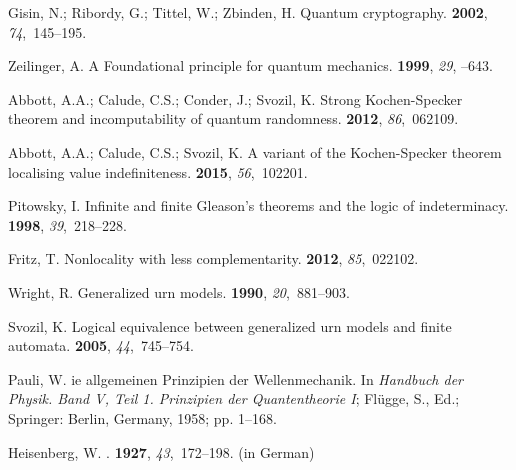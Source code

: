 \documentclass[information,article,accept,moreauthors,pdftex,12pt,a4paper]{mdpi}
\theoremstyle{mdpi}
\newcounter{re}
\theoremstyle{mdpidefinition}
\begin{document}
\begin{thebibliography}{----}
Gisin, N.; Ribordy, G.; Tittel, W.; Zbinden, H.
\newblock Quantum cryptography.
 {\bf 2002}, {\em 74},~145--195.

Zeilinger, A.
\newblock A Foundational principle for quantum mechanics.
 {\bf 1999}, {\em 29}, --643.

Abbott, A.A.; Calude, C.S.; Conder, J.; Svozil, K.
\newblock Strong {K}ochen-{S}pecker theorem and incomputability of quantum
 randomness.
 {\bf 2012}, {\em 86},~062109.

Abbott, A.A.; Calude, C.S.; Svozil, K.
\newblock A variant of the {K}ochen-{S}pecker theorem localising value
 indefiniteness.
 {\bf 2015}, {\em 56},~102201.

Pitowsky, I.
\newblock Infinite and finite {G}leason's theorems and the logic of
 indeterminacy.
 {\bf 1998}, {\em 39},~218--228.

Fritz, T.
\newblock Nonlocality with less complementarity.
 {\bf 2012}, {\em 85},~022102.

Wright, R.
\newblock Generalized urn models.
 {\bf 1990}, {\em 20},~881--903.

Svozil, K.
\newblock Logical equivalence between generalized urn models and finite
 automata.
 {\bf 2005}, {\em
 44},~745--754.

Pauli, W.
ie allgemeinen {P}rinzipien der {W}ellenmechanik. In {\em
 {H}andbuch der {P}hysik. {B}and {V}, {T}eil 1. {P}rinzipien der
 {Q}uantentheorie {I}}; Fl{\"{u}}gge, S., Ed.; Springer: Berlin,
 Germany, 1958; \linebreak pp. 1--168.

Heisenberg, W.
.
 {\bf 1927}, {\em 43},~172--198. (in German)


\end{thebibliography}
\end{document}
